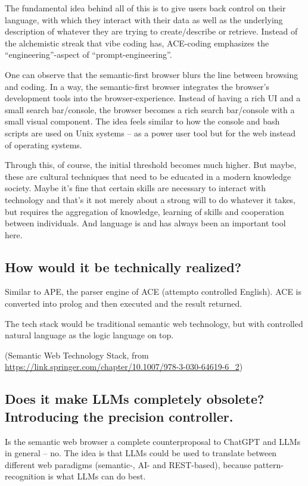 \documentclass[12pt,a4paper]{article}
\begin{document}
The fundamental idea behind all of this is to give users back control on their language, with which they interact with their data as well as the underlying description of whatever they are trying to create/describe or retrieve. Instead of the alchemistic streak that vibe coding has, ACE-coding emphasizes the ``engineering''-aspect of ``prompt-engineering''.

One can observe that the semantic-first browser blurs the line between browsing and coding. In a way, the semantic-first browser integrates the browser's development tools into the browser-experience. Instead of having a rich UI and a small search bar/console, the browser becomes a rich search bar/console with a small visual component. The idea feels similar to how the console and bash scripts are used on Unix systems -- as a power user tool but for the web instead of operating systems.

Through this, of course, the initial threshold becomes much higher. But maybe, these are cultural techniques that need to be educated in a modern knowledge society. Maybe it's fine that certain skills are necessary to interact with technology and that's it not merely about a strong will to do whatever it takes, but requires the aggregation of knowledge, learning of skills and cooperation between individuals. And language is and has always been an important tool here.

\subsection{How would it be technically realized?}

Similar to APE, the parser engine of ACE (attempto controlled English). ACE is converted into prolog and then executed and the result returned.

The tech stack would be traditional semantic web technology, but with controlled natural language as the logic language on top.

(Semantic Web Technology Stack, from \url{https://link.springer.com/chapter/10.1007/978-3-030-64619-6_2})

\subsection{Does it make LLMs completely obsolete? Introducing the precision controller.}

Is the semantic web browser a complete counterproposal to ChatGPT and LLMs in general -- no. The idea is that LLMs could be used to translate between different web paradigms (semantic-, AI- and REST-based), because pattern-recognition is what LLMs can do best.
\end{document}

